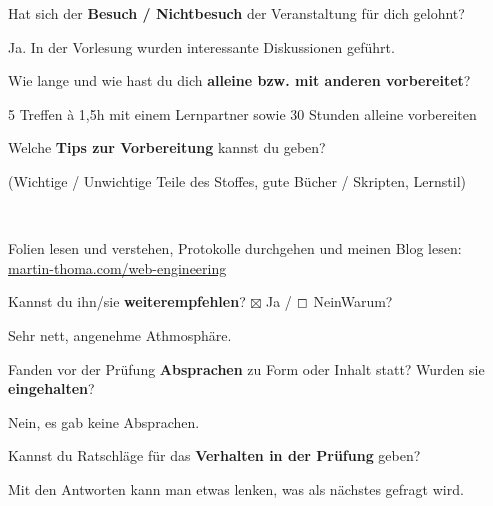 \documentclass[a4paper]{article}
\begin{document}
 \begin{multicols}{2}

   Hat sich der \textbf{Besuch / Nichtbesuch} der Veranstaltung für dich gelohnt? \\
  \begin{minipage}[t][6.8cm]{\linewidth}
    Ja. In der Vorlesung wurden interessante Diskussionen geführt.

  \end{minipage}

   Wie lange und wie hast du dich \textbf{alleine bzw. mit anderen vorbereitet}? \\ 
  \begin{minipage}[t][7cm]{\linewidth}
    5 Treffen à 1,5h mit einem Lernpartner sowie 30 Stunden alleine vorbereiten

  \end{minipage}

   Welche \textbf{Tips zur Vorbereitung} kannst du geben?
  \begin{footnotesize}(Wichtige / Unwichtige Teile des Stoffes, gute Bücher / Skripten, Lernstil)\end{footnotesize} \\
  \begin{minipage}[t][7cm]{\linewidth}
    Folien lesen und verstehen, Protokolle durchgehen und
    meinen Blog lesen:\\
    \href{http://martin-thoma.com/web-engineering/}{martin-thoma.com/web-engineering}
  \end{minipage}

\columnbreak

   Kannst du ihn/sie \textbf{weiterempfehlen}? 
  $\boxtimes$ Ja / $\boxempty$ Nein\newline Warum? \\
  \begin{minipage}[t][6.8cm]{\linewidth}
    Sehr nett, angenehme Athmosphäre.

  \end{minipage}

   Fanden vor der Prüfung \textbf{Absprachen} zu Form oder Inhalt statt? Wurden sie \textbf{eingehalten}? \\
  \begin{minipage}[t][7cm]{\linewidth}
    Nein, es gab keine Absprachen.

  \end{minipage}

   Kannst du Ratschläge für das \textbf{Verhalten in der Prüfung} geben? \\
  \begin{minipage}[t][6.8cm]{\linewidth}
    Mit den Antworten kann man etwas lenken, was als nächstes 
    gefragt wird.

  \end{minipage}
% 
\end{multicols}
\clearpage 
\end{document}
